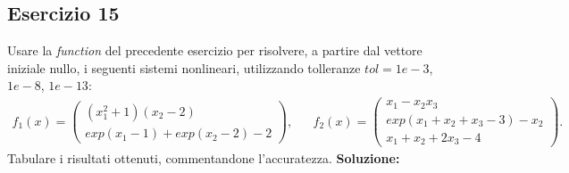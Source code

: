 \subsection{Esercizio 15}
Usare la \textit{function} del precedente esercizio per risolvere, a partire dal vettore iniziale
nullo, i seguenti sistemi nonlineari, utilizzando tolleranze $tol = 1e-3$, $1e-8$, $1e-13$:
\begin{eqnarray*}
    f_1(x) = \left(\begin{array}{c}
        (x^{2}_{1} + 1)(x_2 - 2) \\
        exp(x_1 - 1) + exp(x_2 - 2) - 2
    \end{array}\right), & & f_2(x) = \left(\begin{array}{c}
        x_1 - x_2x_3                   \\
        exp(x_1 + x_2 + x_3 - 3) - x_2 \\
        x_1 + x_2 + 2x_3 - 4
    \end{array}\right).
\end{eqnarray*}
Tabulare i risultati ottenuti, commentandone l'accuratezza.
\newline \textbf{Soluzione:}

